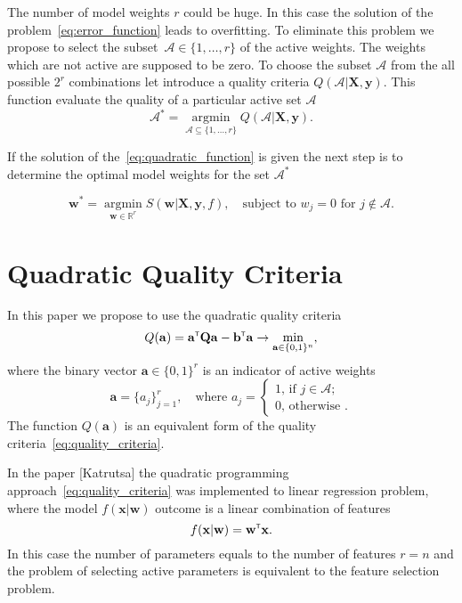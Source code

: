 \documentclass[a4paper,12pt]{article}
\theoremstyle{plain} %
\theoremstyle{definition} %
\theoremstyle{remark} %
\newcommand{\ba}{\mathbf{a}}
\newcommand{\bb}{\mathbf{b}}
\newcommand{\bw}{\mathbf{w}}
\newcommand{\bQ}{\mathbf{Q}}
\newcommand{\by}{\mathbf{y}}
\newcommand{\bx}{\mathbf{x}}
\newcommand{\bX}{\mathbf{X}}
\newcommand{\cA}{\mathcal{A}}
\newcommand{\bbR}{\mathbb{R}}
\newcommand{\T}{{\text{\tiny\sffamily\upshape\mdseries T}}}
\newcommand{\argmin}{\mathop{\arg \min}\limits}
\begin{document}
	The number of model weights $r$ could be huge. 
	In this case the solution of the problem~\ref{eq:error_function} leads to overfitting. 
	To eliminate this problem we propose to select the subset~$\cA \in \{1, \dots, r\}$ of the active weights. 
	The weights which are not active are supposed to be zero.
	To choose the subset $\cA$ from the all possible $2^r$ combinations let introduce a quality criteria $Q(\cA | \bX, \by)$. This function evaluate the quality of a particular active set $\cA$
	\begin{equation}
		\cA^* = \argmin_{\cA \subseteq \{1, \dots, r\}} Q(\cA | \bX, \by).
		\label{eq:quality_criteria}
	\end{equation}
	
	If the solution of the~\ref{eq:quadratic_function} is given the next step is to determine the optimal model weights	for the set $\cA^*$
	
	\begin{equation}
		\bw^* = \argmin_{\bw \in \bbR^r} S(\bw | \bX, \by, f), \quad \text{subject to } w_j = 0 \text{ for } j \notin \cA.
		\label{eq:reduced_error_function}
	\end{equation}
	
	\section*{Quadratic Quality Criteria}
	
	In this paper we propose to use the quadratic quality criteria
	\begin{equation}
	Q(\ba) = \ba^{\T} \bQ \ba - \bb^{\T} \ba \rightarrow \min_{\ba \in \{0,1\}^n},
	\label{eq:quadratic_function}
	\end{equation}
	where the binary vector $\ba \in \{0, 1\}^r$ is an indicator of active weights
	\begin{equation}
	\ba = \{a_j\}_{j=1}^r, \quad \text{where }
	a_j = 
	\begin{cases}
	1, \, \text{if } j \in \cA; \\
	0, \, \text{otherwise }.
	\end{cases}
	\end{equation}
	The function $Q(\ba)$ is an equivalent form of the quality criteria~\ref{eq:quality_criteria}.
	
	In the paper [Katrutsa] the quadratic programming approach~\ref{eq:quality_criteria} was implemented to linear regression problem, where the model $f(\bx | \bw)$ outcome is a linear combination of features
	\begin{equation}
		f(\bx | \bw) = \bw^{\T} \bx.
	\end{equation}
	In this case the number of parameters equals to the number of features $r=n$ and the problem of selecting active parameters is equivalent to the feature selection problem.
	
\end{document}
